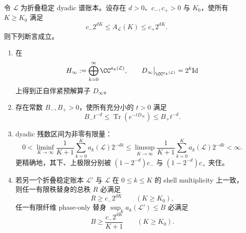 \begin{theorem}[折叠稳定谱账本的体积残数门]\label{distill:connes_spectral_triples_and_chamseddine_connes_spectral_action-spectral_dimension_and_volume_family-fold-stable-dyadic-volume-residue-gate}
令 \(\mathcal L\) 为折叠稳定 dyadic 谱账本。设存在 \(d>0\)、\(c_-,c_+>0\) 与 \(K_0\)，使所有 \(K\ge K_0\) 满足
\[
 c_-2^{dK}\le A_{\mathcal L}(K)\le c_+2^{dK}.\tag{\(*\)}
\]
则下列断言成立。
\begin{enumerate}
  \item 在
  \[
  H_\infty:=\bigoplus_{k=0}^{\infty}\CC^{a_k(\mathcal L)},\qquad
  D_\infty\big|_{\CC^{a_k(\mathcal L)}}=2^k\mathrm{Id}
  \]
  上得到正自伴紧预解算子 \(D_\infty\)。
  \item 存在常数 \(B_-,B_+>0\)，使所有充分小的 \(t>0\) 满足
  \[
  B_-t^{-d}\le \operatorname{Tr}(e^{-tD_\infty})\le B_+t^{-d}.
  \]
  \item dyadic 残数区间为非零有限量：
  \[
  0<\liminf_{K\to\infty}\frac{1}{K+1}\sum_{k=0}^{K}a_k(\mathcal L)2^{-dk}
  \le
  \limsup_{K\to\infty}\frac{1}{K+1}\sum_{k=0}^{K}a_k(\mathcal L)2^{-dk}<\infty.
  \]
  更精确地，其下、上极限分别被 \((1-2^{-d})c_-\) 与 \((1-2^{-d})c_+\) 夹住。
  \item 若另一个折叠稳定账本 \(\mathcal L'\) 与 \(\mathcal L\) 在 \(0\le k\le K\) 的 shell multiplicity 上一致，则任一有限秩替身的总秩 \(R\) 必满足
  \[
  R\ge c_-2^{dK}\qquad(K\ge K_0),
  \]
  任一有限纤维 phase-only 替身 \(\sup_k a_k(\mathcal L')\le B\) 必满足
  \[
  B\ge \frac{c_-2^{dK}}{K+1}\qquad(K\ge K_0).
  \]
\end{enumerate}
\end{theorem}
